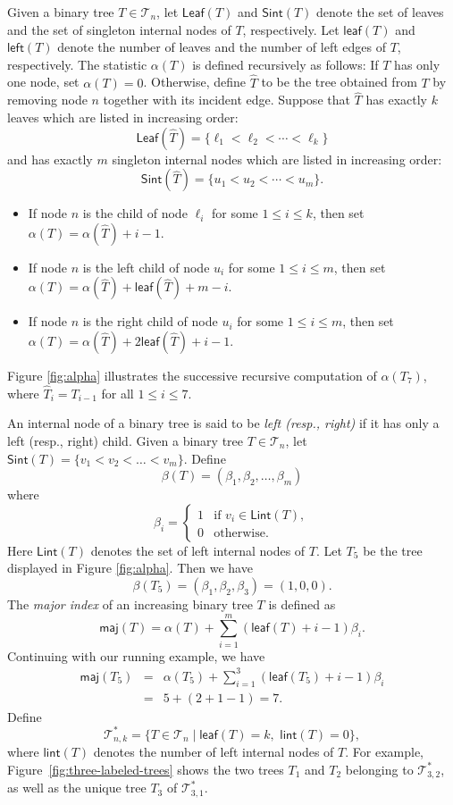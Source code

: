 \documentclass[12pt]{article}
\numberwithin{equation}{section}
\theoremstyle{plain}
\def\maj{\mathsf{maj}}
\def\Lint{\mathsf{Lint}}
\def\Leaf{\mathsf{Leaf}}
\def\l{\mathsf{left}}
\def\Sint{\mathsf{Sint}}
\def\l{\mathsf{left}}
\def\lint{\mathsf{lint}}
\def\B{\mathcal{T}}
\def\leaf{\mathsf{leaf}}
\begin{document}
 
 
 
 Given a binary tree $T\in \B_n$,  let $\Leaf(T)$ and $\Sint(T)$ denote the set of leaves and the set of singleton internal nodes of $T$, respectively. 
 Let $\leaf(T)$ and $\l(T)$ denote the number of leaves and the number of left edges of $T$, respectively. 
 The statistic $\alpha(T)$ is defined recursively as follows:
If $T$ has only one node, set $\alpha(T)=0$. Otherwise, define $\hat{T}$ to be the tree obtained from $T$ by removing  node $n$  together with  its incident edge.  Suppose that $\hat{T}$ has exactly $k$ leaves which are listed in increasing order:
$$
\Leaf(\hat{T})=\{\ell_1<\ell_2<\cdots<\ell_k\}
$$
  and has exactly $m$ singleton internal nodes which are listed in increasing order:
  $$
  \Sint(\hat{T})=\{u_1<u_2<\cdots<u_m\}.
  $$
\begin{itemize}
 
	\item If node $n$ is the child of node $\ell_i$ for some $1\leq i\leq k$, then set $\alpha(T)=\alpha(\hat{T})+i-1$.
	\item If node $n$ is the left  child of node $u_i$ for some $1\leq i\leq m$, then set $\alpha(T)=\alpha(\hat{T})+\leaf(\hat{T})+m-i$.
		\item If node $n$ is the right  child of node $u_i$ for some $1\leq i\leq m$, then set $\alpha(T)=\alpha(\hat{T})+2\leaf(\hat{T})+i-1$.
\end{itemize}

Figure \ref{fig:alpha} illustrates the successive recursive computation 
 of $\alpha(T_7)$, where $\hat{T}_i=T_{i-1}$ for all $1\leq i\leq 7$.



An  internal node of a binary tree  is said to be {\em left (resp.,  right)} if it has only  a left (resp.,  right) child.  
  Given a binary tree $T\in \B_n$,   let $\Sint(T)=\{v_1< v_2<\ldots< v_m\}$.   Define  $$\beta(T)=(\beta_1, \beta_2, \ldots, \beta_m)$$
  where 
  $$
  \beta_i=\left\{
   \begin{array}{ll}
  	1 & \text{if }  v_i\in \Lint(T),\\[2pt]
  0& \text{otherwise}.
  \end{array}
  \right.
  $$
  Here $\Lint(T)$ denotes the set of  left  internal nodes   of $T$. 
  Let $T_5$ be the tree displayed in Figure \ref{fig:alpha}. Then we have
  $$
  \beta(T_5)=(\beta_1, \beta_2, \beta_3)=(1,0,0).
  $$ 
The {\em major index} of an increasing binary tree $T$ is defined as 
	 $$
	 \maj(T)=\alpha(T)+\sum\limits_{i=1}^{m}(\leaf(T)+i-1) \beta_i.
	 $$
	 Continuing with our running example, we have
	 $$
	 \begin{array}{lll}
	 \maj(T_5)&=&\alpha(T_5)+\sum\limits_{i=1}^{3}(\leaf(T_5)+i-1)\beta_i\\
	 	&=& 5+(2+1-1)=7.
	 	\end{array}
	 $$
	Define $$\B^*_{n,k}=\{T\in \B_n\mid  \leaf(T)=k, \,\, \lint(T)=0\},$$
	 where $\lint(T)$ denotes the number of left   internal nodes of $T$.  
	For example, Figure~\ref{fig:three-labeled-trees} shows the two trees $T_1$ and $T_2$ belonging to $\B^*_{3,2}$, as well as the unique tree $T_3$ of $\B^*_{3,1}$.
	
\end{document}
